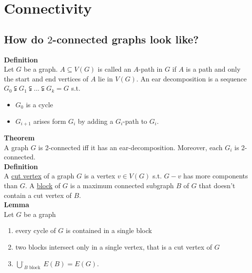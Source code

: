 \documentclass[a4paper, 12pt]{article}
\begin{document}
	\section{Connectivity}
	\subsection{How do $2$-connected graphs look like?}
	\textbf{Definition}\\
	Let $G$ be a graph. $A \subseteq V(G)$ is called an $A$-path in $G$ if $A$ is a path and only the start and end vertices of $A$ lie in $V(G)$. An ear decomposition is a sequence $G_0 \subsetneqq G_1 \subsetneqq ... \subsetneqq G_k = G$ s.t. \begin{itemize}
		\item $G_0$ is a cycle
		\item $G_{i+1}$ arises form $G_i$ by adding a $G_i$-path to $G_i$.
	\end{itemize}  
	\textbf{Theorem}\\
	A graph $G$ is 2-connected iff it has an ear-decomposition. Moreover, each $G_i$ is 2-connected.\\
	\textbf{Definition}\\
	A \underline{cut vertex} of a graph $G$ is a vertex $v \in V(G)$ s.t. $G-v$ has more components than $G$. A \underline{block} of $G$ is a maximum connected subgraph $B$ of $G$ that doesn't contain a cut vertex of $B$.\\
	\textbf{Lemma}\\
	Let $G$ be a graph \begin{enumerate}
		\item every cycle of $G$ is contained in a single block
		\item two blocks intersect only in a single vertex, that is a cut vertex of $G$
		\item $\overset{.}{\bigcup}_{B \text{ block }} E(B) = E(G)$.
	\end{enumerate}
\end{document}
